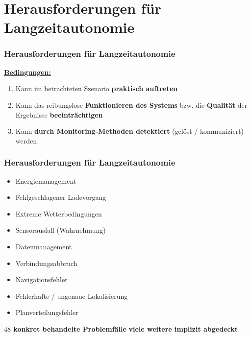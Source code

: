 \documentclass{beamer}
\begin{document}
\section{Herausforderungen für Langzeitautonomie}

\begin{frame}
  \frametitle{Herausforderungen für Langzeitautonomie}
  \textbf{\underline{Bedingungen:}}
  \begin{enumerate}
    \item Kann im betrachteten Szenario \textbf{praktisch auftreten}
    \item Kann das reibungslose \textbf{Funktionieren des Systems} bzw. die \textbf{Qualität} der Ergebnisse \textbf{beeinträchtigen}
    \item Kann \textbf{durch Monitoring-Methoden detektiert} (gelöst / kommuniziert) werden
  \end{enumerate}
\end{frame}

\begin{frame}
  \frametitle{Herausforderungen für Langzeitautonomie}
  \begin{itemize}
    \item Energiemanagement
    \item Fehlgeschlagener Ladevorgang
    \item Extreme Wetterbedingungen
    \item Sensorausfall (Wahrnehmung)
    \item Datenmanagement
    \item Verbindungsabbruch
    \item Navigationsfehler
    \item Fehlerhafte / ungenaue Lokalisierung
    \item Planverteilungsfehler
  \end{itemize}
  \textrightarrow \thinspace \textbf{$48$ konkret behandelte Problemfälle}\newline
  \textrightarrow \thinspace \textbf{viele weitere implizit abgedeckt}
\end{frame}
\end{document}
